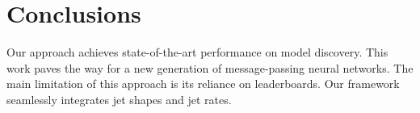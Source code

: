 \section{Conclusions}\label{sec:conclusions}

Our approach achieves state-of-the-art performance on model discovery.
This work paves the way for a new generation of message-passing neural
networks. The main limitation of this approach is its reliance on
leaderboards. Our framework seamlessly integrates jet shapes and jet
rates.

